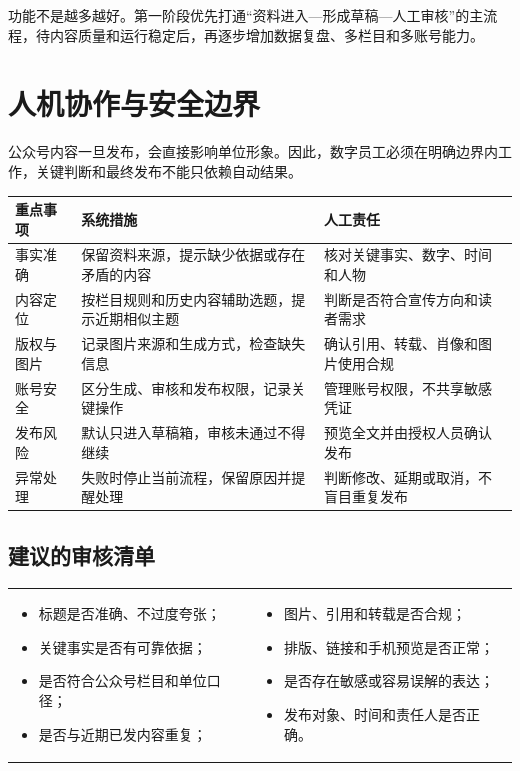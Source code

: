 \documentclass[UTF8,11pt,a4paper,fontset=none]{ctexart}
\begin{document}
\begin{keybox}[设计原则]
功能不是越多越好。第一阶段优先打通“资料进入—形成草稿—人工审核”的主流程，待内容质量和运行稳定后，再逐步增加数据复盘、多栏目和多账号能力。
\end{keybox}

\clearpage

\section{人机协作与安全边界}

公众号内容一旦发布，会直接影响单位形象。因此，数字员工必须在明确边界内工作，关键判断和最终发布不能只依赖自动结果。

\begin{tabularx}{\textwidth}{@{}L{32mm} Y Y@{}}
\toprule
\textbf{重点事项} & \textbf{系统措施} & \textbf{人工责任} \\
\midrule
事实准确 & 保留资料来源，提示缺少依据或存在矛盾的内容 & 核对关键事实、数字、时间和人物 \\
内容定位 & 按栏目规则和历史内容辅助选题，提示近期相似主题 & 判断是否符合宣传方向和读者需求 \\
版权与图片 & 记录图片来源和生成方式，检查缺失信息 & 确认引用、转载、肖像和图片使用合规 \\
账号安全 & 区分生成、审核和发布权限，记录关键操作 & 管理账号权限，不共享敏感凭证 \\
发布风险 & 默认只进入草稿箱，审核未通过不得继续 & 预览全文并由授权人员确认发布 \\
异常处理 & 失败时停止当前流程，保留原因并提醒处理 & 判断修改、延期或取消，不盲目重复发布 \\
\bottomrule
\end{tabularx}

\subsection{建议的审核清单}

\begin{tabularx}{\textwidth}{@{}Y Y@{}}
\begin{itemize}
  \item 标题是否准确、不过度夸张；
  \item 关键事实是否有可靠依据；
  \item 是否符合公众号栏目和单位口径；
  \item 是否与近期已发内容重复；
\end{itemize}
&
\begin{itemize}
  \item 图片、引用和转载是否合规；
  \item 排版、链接和手机预览是否正常；
  \item 是否存在敏感或容易误解的表达；
  \item 发布对象、时间和责任人是否正确。
\end{itemize}
\end{tabularx}
\end{document}
